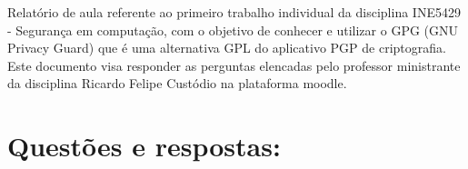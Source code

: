 \documentclass[
    article,            %
    11pt,               %
    oneside,            %
    a4paper,            %
    english,            %
    brazil,             %
    sumario=tradicional,
    ]{abntex2}
\begin{document}

\frenchspacing 


%
%

\maketitle


\begin{resumoumacoluna}
    Relatório de aula referente ao primeiro trabalho individual da disciplina INE5429 - Segurança em computação, com o objetivo de conhecer e utilizar o GPG (GNU Privacy Guard) que é uma alternativa GPL do aplicativo PGP de criptografia. Este documento visa responder as perguntas elencadas pelo professor ministrante da disciplina Ricardo Felipe Custódio na plataforma moodle.
 
 \vspace{\onelineskip}
 
\end{resumoumacoluna}


\textual


\section*{\textbf{Questões e respostas:}}
\end{document}
